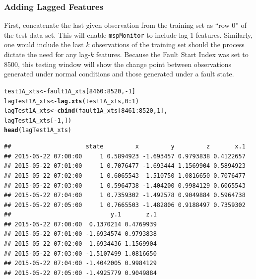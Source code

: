 \documentclass{report}\usepackage[]{graphicx}\usepackage[]{color}
\makeatletter
\newcommand{\hlnum}[1]{\textcolor[rgb]{0.686,0.059,0.569}{#1}}%
\newcommand{\hlopt}[1]{\textcolor[rgb]{0,0,0}{#1}}%
\newcommand{\hlstd}[1]{\textcolor[rgb]{0.345,0.345,0.345}{#1}}%
\newcommand{\hlkwb}[1]{\textcolor[rgb]{0.69,0.353,0.396}{#1}}%
\newcommand{\hlkwd}[1]{\textcolor[rgb]{0.737,0.353,0.396}{\textbf{#1}}}%
\newenvironment{kframe}{%
 \def\at@end@of@kframe{}%
 \ifinner\ifhmode%
  \def\at@end@of@kframe{\end{minipage}}%
  \begin{minipage}{\columnwidth}%
 \fi\fi%
 \def\FrameCommand##1{\hskip\@totalleftmargin \hskip-\fboxsep
 \colorbox{shadecolor}{##1}\hskip-\fboxsep
     \hskip-\linewidth \hskip-\@totalleftmargin \hskip\columnwidth}%
 \MakeFramed {\advance\hsize-\width
   \@totalleftmargin\z@ \linewidth\hsize
   \@setminipage}}%
 {\par\unskip\endMakeFramed%
 \at@end@of@kframe}
\newenvironment{knitrout}{}{} %
\makeatother
\begin{document}
\subsubsection{Adding Lagged Features}
First, concatenate the last given observation from the training set as ``row 0'' of the test data set. This will enable \texttt{mspMonitor} to include lag-1 features. Similarly, one would include the last $k$ observations of the training set should the process dictate the need for any lag-$k$ features. Because the Fault Start Index was set to 8500, this testing window will show the change point between observations generated under normal conditions and those generated under a fault state.
\begin{knitrout}
\color{fgcolor}\begin{kframe}
\begin{alltt}
\hlstd{test1A_xts} \hlkwb{<-} \hlstd{fault1A_xts[}\hlnum{8460}\hlopt{:}\hlnum{8520}\hlstd{,} \hlopt{-}\hlnum{1}\hlstd{]}
\hlstd{lagTest1A_xts} \hlkwb{<-} \hlkwd{lag.xts}\hlstd{(test1A_xts,} \hlnum{0}\hlopt{:}\hlnum{1}\hlstd{)}
\hlstd{lagTest1A_xts} \hlkwb{<-} \hlkwd{cbind}\hlstd{(fault1A_xts[}\hlnum{8461}\hlopt{:}\hlnum{8520}\hlstd{,}\hlnum{1}\hlstd{],}
                       \hlstd{lagTest1A_xts[}\hlopt{-}\hlnum{1}\hlstd{,])}
\hlkwd{head}\hlstd{(lagTest1A_xts)}
\end{alltt}
\begin{verbatim}
##                     state         x         y         z       x.1
## 2015-05-22 07:00:00     1 0.5894923 -1.693457 0.9793838 0.4122657
## 2015-05-22 07:01:00     1 0.7076477 -1.693444 1.1569904 0.5894923
## 2015-05-22 07:02:00     1 0.6065543 -1.510750 1.0816650 0.7076477
## 2015-05-22 07:03:00     1 0.5964738 -1.404200 0.9984129 0.6065543
## 2015-05-22 07:04:00     1 0.7359302 -1.492578 0.9049884 0.5964738
## 2015-05-22 07:05:00     1 0.7665503 -1.482806 0.9188497 0.7359302
##                            y.1       z.1
## 2015-05-22 07:00:00  0.1370214 0.4769939
## 2015-05-22 07:01:00 -1.6934574 0.9793838
## 2015-05-22 07:02:00 -1.6934436 1.1569904
## 2015-05-22 07:03:00 -1.5107499 1.0816650
## 2015-05-22 07:04:00 -1.4042005 0.9984129
## 2015-05-22 07:05:00 -1.4925779 0.9049884
\end{verbatim}
\end{kframe}
\end{knitrout}
\end{document}
